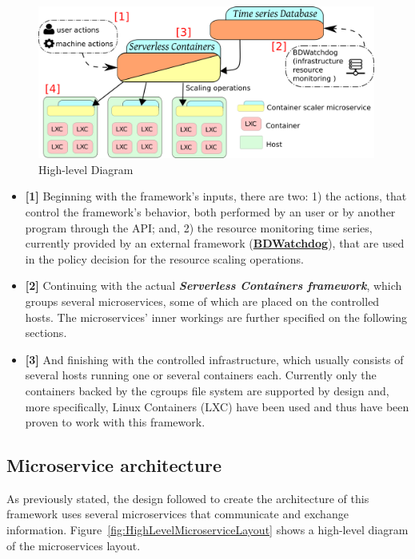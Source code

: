 \documentclass[12pt]{article}
\begin{document}
\begin{figure}[!tb]
	\centering
	\includegraphics[width=0.99\textwidth]{../img/architecture/scenario_diagram.png}
	\caption{High-level Diagram}
	\label{fig:HighLevelDiagram}
\end{figure}

\begin{itemize}
	\item \textbf{[1]} Beginning with the framework's inputs, there are two: 1) the actions, that control the framework's behavior, both performed by an user or by another program through the API; and, 2) the resource monitoring time series, currently provided by an external framework (\textbf{\href{http://bdwatchdog.dec.udc.es/monitoring/index.html}{BDWatchdog}}), that are used in the policy decision for the resource scaling operations.
	
	\item \textbf{[2]} Continuing with the actual \textit{\textbf{Serverless Containers framework}}, which groups several microservices, some of which are placed on the controlled hosts. The microservices' inner workings are further specified on the following sections.
	
	\item \textbf{[3]} And finishing with the controlled infrastructure, which usually consists of several hosts running one or several containers each. Currently only the containers backed by the cgroups file system are supported by design and, more specifically, Linux Containers (LXC) have been used and thus have been proven to work with this framework.
\end{itemize}


\subsection{Microservice architecture}

As previously stated, the design followed to create the architecture of this framework uses several microservices that communicate and exchange information. Figure~\ref{fig:HighLevelMicroserviceLayout} shows a high-level diagram of the microservices layout.
\end{document}
